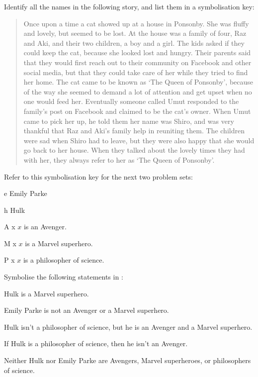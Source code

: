 \documentclass[PHIL101-Textbook.tex]{subfiles}
\begin{document}
\pagebreak
\practiceproblems
\problempart

Identify all the names in the following story, and list them in a symbolisation key:

\begin{quote}
Once upon a time a cat showed up at a house in Ponsonby. She was fluffy and lovely, but seemed to be lost. At the house was a family of four, Raz and Aki, and their two children, a boy and a girl. The kids asked if they could keep the cat, because she looked lost and hungry. Their parents said that they would first reach out to their community on Facebook and other social media, but that they could take care of her while they tried to find her home. The cat came to be known as `The Queen of Ponsonby’, because of the way she seemed to demand a lot of attention and get upset when no one would feed her. Eventually someone called Umut responded to the family’s post on Facebook and claimed to be the cat’s owner. When Umut came to pick her up, he told them her name was Shiro, and was very thankful that Raz and Aki’s family help in reuniting them. The children were sad when Shiro had to leave, but they were also happy that she would go back to her house. When they talked about the lovely times they had with her, they always refer to her as `The Queen of Ponsonby’. 
  \end{quote}
 
\medskip
  
Refer to this symbolisation key for the next two problem sets: 
\begin{ekey}
\item[e] Emily Parke
\item[h] Hulk
\item[\atom A x ] $x$ is an Avenger.
\item[\atom M x ] $x$ is a Marvel superhero. 
\item[\atom P x ] $x$ is a philosopher of science.
\end{ekey}

\noindent\problempart
\label{pr.pl.symbol1}

Symbolise the following statements in \pl:
\begin{earg}
\item Hulk is a Marvel superhero.
\item Emily Parke is not an Avenger or a Marvel superhero.
\item Hulk isn't a philosopher of science, but he is an Avenger and a Marvel superhero.
\item If Hulk is a philosopher of science, then he isn't an Avenger.
\item Neither Hulk nor Emily Parke are Avengers, Marvel superheroes, or philosophers of science. 
\end{earg}
\end{document}
